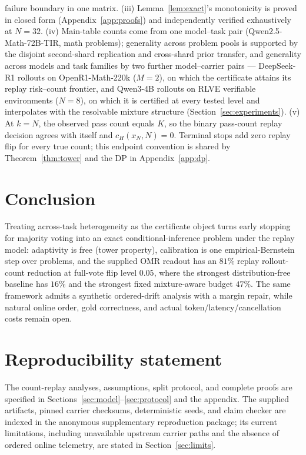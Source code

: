 \documentclass{article}
\theoremstyle{definition}
\theoremstyle{remark}
\newcommand{\cert}{c_H}
\begin{document}
failure boundary in one matrix.
(iii) Lemma~\ref{lem:exact}'s monotonicity is proved in closed form
(Appendix~\ref{app:proofs}) and independently verified exhaustively at
$N=32$.
(iv) Main-table counts come from one model--task pair
(Qwen2.5-Math-72B-TIR, math problems); generality across problem pools is
supported by the disjoint second-shard replication and cross-shard prior
transfer, and generality across models and task families by two further
model--carrier pairs --- DeepSeek-R1 rollouts on OpenR1-Math-220k ($M=2$),
on which the certificate attains its replay risk--count frontier, and
Qwen3-4B rollouts on RLVE verifiable environments ($N=8$), on which it is
certified at every tested level and interpolates with the resolvable mixture
structure (Section~\ref{sec:experiments}).
(v) At $k=N$, the observed pass count equals $K$, so the binary pass-count
replay decision agrees with itself and $\cert(x_N,N)=0$. Terminal stops add
zero replay flip for every true count; this endpoint convention is shared by
Theorem~\ref{thm:tower} and the DP in Appendix~\ref{app:dp}.

\section{Conclusion}
Treating across-task heterogeneity as the certificate object turns early
stopping for majority voting into an exact conditional-inference problem under
the replay model: adaptivity is free (tower property), calibration is one
empirical-Bernstein step over problems, and the supplied OMR readout has an
$81\%$ replay rollout-count reduction at full-vote flip level $0.05$, where
the strongest distribution-free baseline has $16\%$ and the strongest fixed
mixture-aware budget $47\%$. The same framework admits a synthetic
ordered-drift analysis with a margin repair, while natural online order, gold
correctness, and actual token/latency/cancellation costs remain open.

\section*{Reproducibility statement}
The count-replay analyses, assumptions, split protocol, and complete proofs
are specified in Sections~\ref{sec:model}--\ref{sec:protocol} and the
appendix. The supplied artifacts, pinned carrier checksums, deterministic
seeds, and claim checker are indexed in the anonymous supplementary
reproduction package; its current limitations, including unavailable upstream
carrier paths and the absence of ordered online telemetry, are stated in
Section~\ref{sec:limits}.
\end{document}
